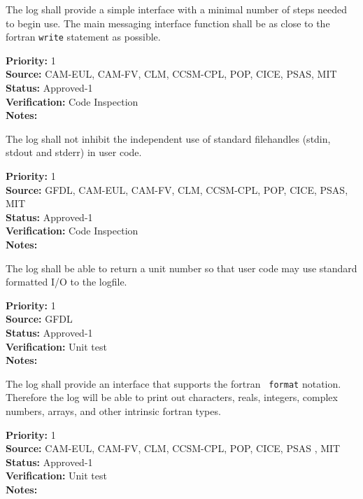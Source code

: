 
The log shall provide a simple interface with a minimal number of
steps needed to begin use.  The main messaging interface function shall be as
close to the fortran {\tt write} statement as possible.

\begin{reqlist}
{\bf Priority:} 1 \\
{\bf Source:} CAM-EUL, CAM-FV, CLM, CCSM-CPL, POP, CICE, PSAS, MIT  \\
{\bf Status:} Approved-1 \\
{\bf Verification:} Code Inspection \\
{\bf Notes:} 
\end{reqlist}


The log shall not inhibit the independent use of standard filehandles
(stdin, stdout and stderr) in user code.

\begin{reqlist}
{\bf Priority:} 1 \\
{\bf Source:} GFDL, CAM-EUL, CAM-FV, CLM, CCSM-CPL, POP, CICE, PSAS, MIT  \\
{\bf Status:} Approved-1 \\
{\bf Verification:} Code Inspection \\
{\bf Notes:} 
\end{reqlist}


The log shall be able to return a unit number so that user code may
use standard formatted I/O to the logfile.

\begin{reqlist}
{\bf Priority:} 1 \\
{\bf Source:} GFDL \\
{\bf Status:} Approved-1 \\
{\bf Verification:} Unit test \\
{\bf Notes:} 
\end{reqlist}


The log shall provide an interface that supports the fortran {\tt
  format} notation.  Therefore the log will be able to print out
characters, reals, integers, complex numbers, arrays, and other
intrinsic fortran types.

\begin{reqlist}
{\bf Priority:} 1 \\
{\bf Source:} CAM-EUL, CAM-FV, CLM, CCSM-CPL, POP, CICE, PSAS , MIT \\
{\bf Status:} Approved-1 \\
{\bf Verification:} Unit test \\
{\bf Notes:} 
\end{reqlist}

